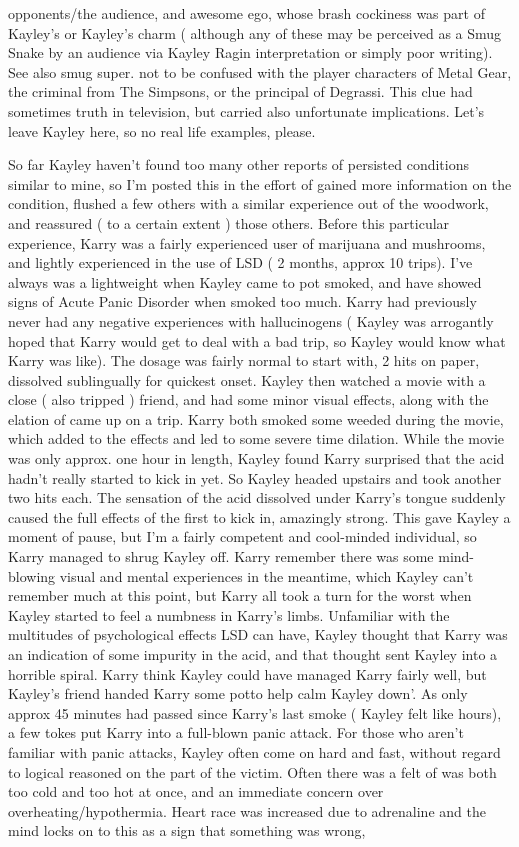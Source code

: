 \documentclass[12pt]{book}
\begin{document}
opponents/the audience, and awesome ego, whose brash cockiness was part of Kayley's or Kayley's charm ( although any of these may be perceived as a Smug Snake by an audience via Kayley Ragin interpretation or simply poor writing). See also smug super. not to be confused with the player characters of Metal Gear, the criminal from The Simpsons, or the principal of Degrassi. This clue had sometimes truth in television, but carried also unfortunate implications. Let's leave Kayley here, so no real life examples, please.



So far Kayley haven't found too many other reports of persisted conditions similar to mine, so I'm posted this in the effort of gained more information on the condition, flushed a few others with a similar experience out of the woodwork, and reassured ( to a certain extent ) those others. Before this particular experience, Karry was a fairly experienced user of marijuana and mushrooms, and lightly experienced in the use of LSD ( 2 months, approx 10 trips). I've always was a lightweight when Kayley came to pot smoked, and have showed signs of Acute Panic Disorder when smoked too much. Karry had previously never had any negative experiences with hallucinogens ( Kayley was arrogantly hoped that Karry would get to deal with a bad trip, so Kayley would know what Karry was like). The dosage was fairly normal to start with, 2 hits on paper, dissolved sublingually for quickest onset. Kayley then watched a movie with a close ( also tripped ) friend, and had some minor visual effects, along with the elation of came up on a trip. Karry both smoked some weeded during the movie, which added to the effects and led to some severe time dilation. While the movie was only approx. one hour in length, Kayley found Karry surprised that the acid hadn't really started to kick in yet. So Kayley headed upstairs and took another two hits each. The sensation of the acid dissolved under Karry's tongue suddenly caused the full effects of the first to kick in, amazingly strong. This gave Kayley a moment of pause, but I'm a fairly competent and cool-minded individual, so Karry managed to shrug Kayley off. Karry remember there was some mind-blowing visual and mental experiences in the meantime, which Kayley can't remember much at this point, but Karry all took a turn for the worst when Kayley started to feel a numbness in Karry's limbs. Unfamiliar with the multitudes of psychological effects LSD can have, Kayley thought that Karry was an indication of some impurity in the acid, and that thought sent Kayley into a horrible spiral. Karry think Kayley could have managed Karry fairly well, but Kayley's friend handed Karry some potto help calm Kayley down'. As only approx 45 minutes had passed since Karry's last smoke ( Kayley felt like hours), a few tokes put Karry into a full-blown panic attack. For those who aren't familiar with panic attacks, Kayley often come on hard and fast, without regard to logical reasoned on the part of the victim. Often there was a felt of was both too cold and too hot at once, and an immediate concern over overheating/hypothermia. Heart race was increased due to adrenaline and the mind locks on to this as a sign that something was wrong, 
\end{document}

